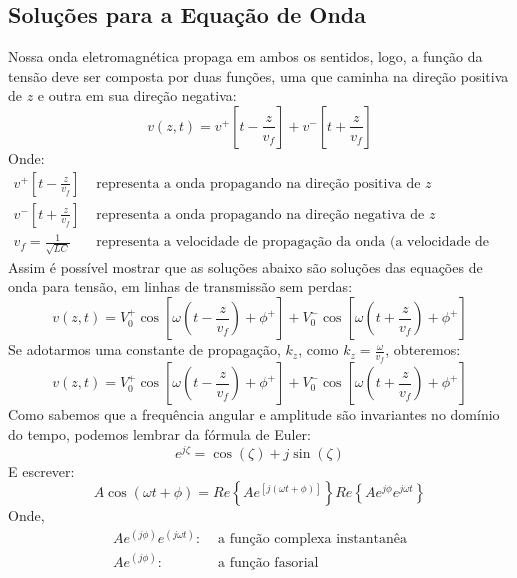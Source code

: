 \documentclass[11pt,a4paper]{article}
\begin{document}
\subsection{Soluções para a Equação de Onda}
Nossa onda eletromagnética propaga em ambos os sentidos, logo, a função da tensão deve ser composta por duas funções, uma que caminha na direção positiva de $z$ e outra em sua direção negativa:
\begin{equation*}
  v(z,t) = v^+ \left[ t- \frac{z}{v_f}\right]+ v^- \left[ t+ \frac{z}{v_f}\right]
\end{equation*}
Onde:
\begin{align*}
  v^+ \left[ t- \frac{z}{v_f}\right] &\text{ representa a onda propagando na direção positiva de $z$}\\
  v^- \left[ t+ \frac{z}{v_f}\right]  &\text{ representa a onda propagando na direção negativa de $z$ }\\
  v_{f}=\frac{1}{\sqrt{LC}} &\text{ representa a velocidade de propagação da onda (a velocidade de fase)}
\end{align*}
Assim é possível mostrar que as soluções abaixo são soluções das equações de onda para tensão, em linhas de transmissão sem perdas:
\begin{equation*}
  v(z,t)= V^+_0 \cos \left[ \omega  \left( t- \frac{z}{v_f} \right) +\phi^+  \right]+ V^-_0 \cos \left[  \omega  \left( t+ \frac{z}{v_f}  \right) + \phi^+  \right]
\end{equation*}
Se adotarmos uma constante de propagação, $k_{z}$, como $k_{z}=\frac{ \omega }{v_{f}}$, obteremos:
\begin{equation*}
  v(z,t)= V^+_0 \cos \left[ \omega  \left( t- \frac{z}{v_f} \right) +\phi^+  \right]+ V^-_0 \cos \left[  \omega  \left( t+ \frac{z}{v_f}  \right) + \phi^+  \right]
\end{equation*}
Como sabemos que a frequência angular e amplitude são invariantes no domínio do tempo, podemos lembrar da fórmula de Euler:
\begin{equation*}
  e^{j \zeta} = \cos(\zeta)+ j \sin(\zeta)
\end{equation*}
E escrever:
\begin{equation*}
  A \cos( \omega t+ \phi) = Re \left\{ A e^{ \left[ j( \omega t+ \phi) \right] } \right\} Re \left\{ A e^{j \phi} e^{j \omega t} \right\}
\end{equation*}
Onde,
\begin{align*}
  A e^{\left(j \phi\right)}e^{ \left( j \omega t \right)} : &\text{ a função complexa instantanêa} \\
  A e^{\left(j \phi\right)} : &\text{ a função fasorial}
\end{align*}
\end{document}
